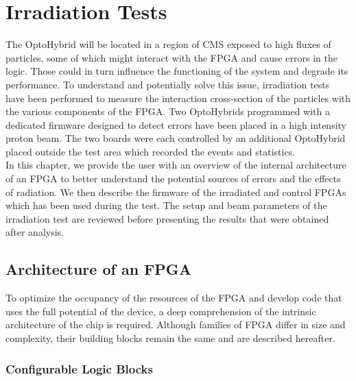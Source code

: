\chapter{Irradiation Tests}
\label{chap:II-6-irradiation}

  The OptoHybrid will be located in a region of CMS exposed to high fluxes of particles, some of which might interact with the FPGA and cause errors in the logic. Those could in turn influence the functioning of the system and degrade its performance. To understand and potentially solve this issue, irradiation tests have been performed to measure the interaction cross-section of the particles with the various components of the FPGA. Two OptoHybrids programmed with a dedicated firmware designed to detect errors have been placed in a high intensity proton beam. The two boards were each controlled by an additional OptoHybrid placed outside the test area which recorded the events and statistics. \\

  In this chapter, we provide the user with an overview of the internal architecture of an FPGA to better understand the potential sources of errors and the effects of radiation. We then describe the firmware of the irradiated and control FPGAs which has been used during the test. The setup and beam parameters of the irradiation test are reviewed before presenting the results that were obtained after analysis.

  \section{Architecture of an FPGA}

    To optimize the occupancy of the resources of the FPGA and develop code that uses the full potential of the device, a deep comprehension of the intrinsic architecture of the chip is required. Although families of FPGA differ in size and complexity, their building blocks remain the same and are described hereafter.

    \subsection{Configurable Logic Blocks}

